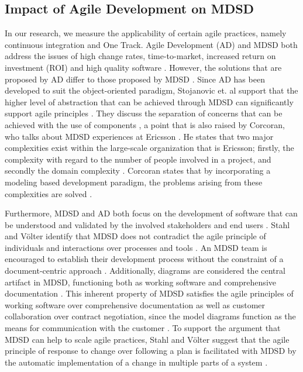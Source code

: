 \documentclass[fina_report_innit.tex]{subfiles}
\begin{document}
\subsection{Impact of Agile Development on MDSD}

In our research, we measure the applicability of certain agile practices, namely continuous integration and One Track. Agile Development (AD) and MDSD both address the issues of high change rates, time-to-market, increased return on investment (ROI) and high quality software \cite{stojanovic2003component}. However, the solutions that are proposed by AD differ to those proposed by MDSD \cite{stojanovic2003component}. Since AD has been developed to suit the object-oriented paradigm, Stojanovic et. al support that the higher level of abstraction that can be achieved through MDSD can significantly support agile principles \cite{stojanovic2003component}. They discuss the separation of concerns that can be achieved with the use of components \cite{stojanovic2003component}, a point that is also raised by Corcoran, who talks about MDSD experiences at Ericsson \cite{selic2010modelling}. He states that two major complexities exist within the large-scale organization that is Ericsson; firstly, the complexity with regard to the number of people involved in a project, and secondly the domain complexity \cite{selic2010modelling}. Corcoran states that by incorporating a modeling based development paradigm, the problems arising from these complexities are solved \cite{selic2010modelling}. 

Furthermore, MDSD and AD both focus on the development of software that can be understood and validated by the involved stakeholders and end users \cite{stahl2006model}. Stahl and Völter identify that MDSD does not contradict the agile principle of individuals and interactions over processes and tools \cite{stahl2006model}. An MDSD team is encouraged to establish their development process without the constraint of a document-centric approach \cite{stahl2006model}. Additionally, diagrams are considered the central artifact in MDSD, functioning both as working software and comprehensive documentation \cite{stahl2006model}. This inherent property of MDSD satisfies the agile principles of working software over comprehensive documentation as well as customer collaboration over contract negotiation, since the model diagrams function as the means for communication with the customer \cite{stahl2006model}. To support the argument that MDSD can help to scale agile practices, Stahl and Völter suggest that the agile principle of response to change over following a plan is facilitated with MDSD by the automatic implementation of a change in multiple parts of a system \cite{stahl2006model}.
\end{document}
